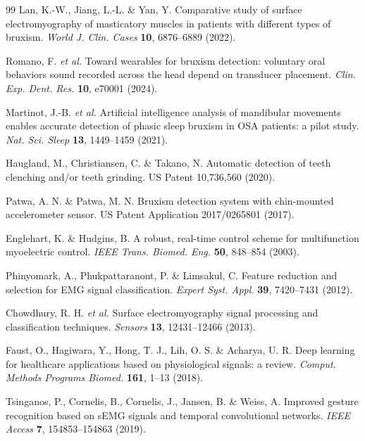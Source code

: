 \documentclass[pdflatex,sn-nature,iicol]{sn-jnl}
\begin{document}
\begin{thebibliography}{99}
\color{blue}
Lan, K.-W., Jiang, L.-L. \& Yan, Y. Comparative study of surface electromyography of masticatory muscles in patients with different types of bruxism. \emph{World J. Clin. Cases} \textbf{10}, 6876--6889 (2022).
\color{black}

\color{blue}
Romano, F. \emph{et al.} Toward wearables for bruxism detection: voluntary oral behaviors sound recorded across the head depend on transducer placement. \emph{Clin. Exp. Dent. Res.} \textbf{10}, e70001 (2024).
\color{black}

\color{blue}
Martinot, J.-B. \emph{et al.} Artificial intelligence analysis of mandibular movements enables accurate detection of phasic sleep bruxism in OSA patients: a pilot study. \emph{Nat. Sci. Sleep} \textbf{13}, 1449--1459 (2021).
\color{black}

\color{blue}
Haugland, M., Christiansen, C. \& Takano, N. Automatic detection of teeth clenching and/or teeth grinding. US Patent 10,736,560 (2020).
\color{black}

\color{blue}
Patwa, A. N. \& Patwa, M. N. Bruxism detection system with chin-mounted accelerometer sensor. US Patent Application 2017/0265801 (2017).
\color{black}

\color{blue}
Englehart, K. \& Hudgins, B. A robust, real-time control scheme for multifunction myoelectric control. \emph{IEEE Trans. Biomed. Eng.} \textbf{50}, 848--854 (2003).
\color{black}

\color{blue}
Phinyomark, A., Phukpattaranont, P. \& Limsakul, C. Feature reduction and selection for EMG signal classification. \emph{Expert Syst. Appl.} \textbf{39}, 7420--7431 (2012).
\color{black}

\color{blue}
Chowdhury, R. H. \emph{et al.} Surface electromyography signal processing and classification techniques. \emph{Sensors} \textbf{13}, 12431--12466 (2013).
\color{black}

\color{blue}
Faust, O., Hagiwara, Y., Hong, T. J., Lih, O. S. \& Acharya, U. R. Deep learning for healthcare applications based on physiological signals: a review. \emph{Comput. Methods Programs Biomed.} \textbf{161}, 1--13 (2018).
\color{black}

\color{blue}
Tsinganos, P., Cornelis, B., Cornelis, J., Jansen, B. \& Weiss, A. Improved gesture recognition based on sEMG signals and temporal convolutional networks. \emph{IEEE Access} \textbf{7}, 154853--154863 (2019).
\color{black}


\end{thebibliography}
\end{document}
